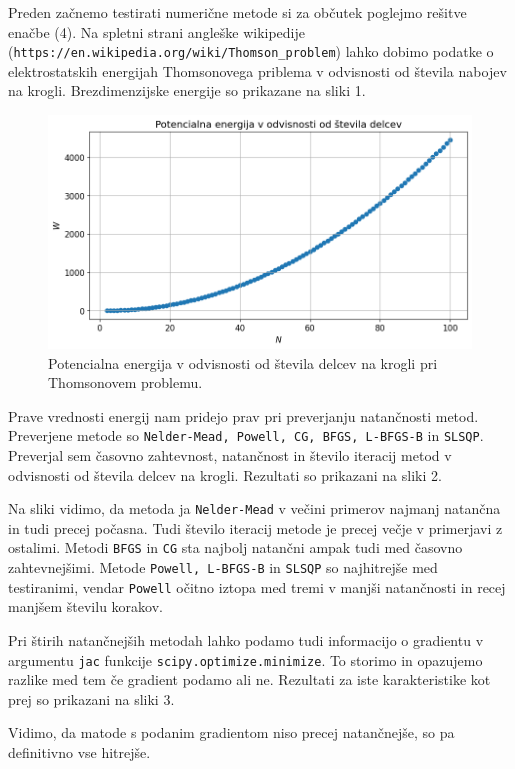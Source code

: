 \documentclass[slovene,11pt,a4paper]{article}
\begin{document}
Preden začnemo testirati numerične metode si za občutek poglejmo rešitve enačbe (4). Na spletni strani angleške wikipedije (\texttt{https://en.wikipedia.org/wiki/Thomson\_problem}) lahko dobimo podatke o elektrostatskih energijah Thomsonovega priblema v odvisnosti od števila nabojev na krogli. Brezdimenzijske energije so prikazane na sliki 1.

\begin{figure}[h!]
\centering
\includegraphics[width=12.5cm]{energije.png}
\caption{Potencialna energija v odvisnosti od števila delcev na krogli pri Thomsonovem problemu.}
\end{figure}

Prave vrednosti energij nam pridejo prav pri preverjanju natančnosti metod. Preverjene metode so \texttt{Nelder-Mead, Powell, CG, BFGS, L-BFGS-B} in \texttt{SLSQP}. Preverjal sem časovno zahtevnost, natančnost in število iteracij metod v odvisnosti od števila delcev na krogli. Rezultati so prikazani na sliki 2.

Na sliki vidimo, da metoda ja \texttt{Nelder-Mead} v večini primerov najmanj natančna in tudi precej počasna. Tudi število iteracij metode je precej večje v primerjavi z ostalimi. Metodi \texttt{BFGS} in \texttt{CG} sta najbolj natančni ampak tudi med časovno zahtevnejšimi. Metode \texttt{Powell, L-BFGS-B} in \texttt{SLSQP} so najhitrejše med testiranimi, vendar \texttt{Powell} očitno iztopa med tremi v manjši natančnosti in recej manjšem številu korakov.

Pri štirih natančnejših metodah lahko podamo tudi informacijo o gradientu v argumentu \texttt{jac} funkcije \texttt{scipy.optimize.minimize}. To storimo in opazujemo razlike med tem če gradient podamo ali ne. Rezultati za iste karakteristike kot prej so prikazani na sliki 3.

Vidimo, da matode s podanim gradientom niso precej natančnejše, so pa definitivno vse hitrejše.
\end{document}
